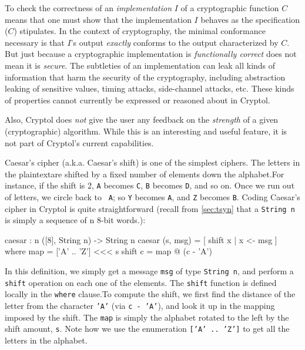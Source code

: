To check the correctness of an \emph{implementation} $I$ of a
cryptographic function $C$ means that one must show that the
implementation $I$ behaves as the specification ($C$) stipulates.  In
the context of cryptography, the minimal conformance necessary is
that $I$'s output \emph{exactly} conforms to the output characterized
by $C$.  But just because a cryptographic implementation is
\emph{functionally correct} does not mean it is \emph{secure}.  The
subtleties of an implementation can leak all kinds of information that
harm the security of the cryptography, including abstraction leaking
of sensitive values, timing attacks, side-channel attacks, etc.  These
kinds of properties cannot currently be expressed or reasoned about in
Cryptol.

Also, Cryptol does \emph{not} give the user any feedback on the
\emph{strength} of a given (cryptographic) algorithm.  While this is
an interesting and useful feature, it is not part of Cryptol's current
capabilities.


Caesar's cipher (a.k.a. Caesar's shift) is one of the simplest
ciphers.  The letters in the plaintext\indPlaintext are shifted by a
fixed number of elements down the alphabet.\indCaesarscipher For
instance, if the shift is 2, {\tt A} becomes {\tt C}, {\tt B} becomes
{\tt D}, and so on. Once we run out of letters, we circle back to {\tt
  A}; so {\tt Y} becomes {\tt A}, and {\tt Z} becomes {\tt B}.  Coding
Caesar's cipher in Cryptol is quite straightforward (recall from
\autoref{sec:tsyn} that a {\tt String n} is simply a sequence of n
8-bit words.):\indTSString
\begin{code}
  caesar : {n} ([8], String n) -> String n
  caesar (s, msg) = [ shift x | x <- msg ]
        where map     = ['A' .. 'Z'] <<< s
              shift c = map @ (c - 'A')
\end{code}
In this definition, we simply get a message \texttt{msg} of type
\texttt{String n}, and perform a \texttt{shift} operation on each one
of the elements. The \texttt{shift} function is defined locally in the
\texttt{where} clause.\indWhere To compute the shift, we first find
the distance of the letter from the character \texttt{'A'} (via
\texttt{c - 'A'}), and look it up in the mapping imposed by the shift.
The {\tt map} is simply the alphabet rotated to the left by the shift
amount, \texttt{s}. Note how we use the enumeration
\texttt{['A' ..\ 'Z']} to get all the letters in the alphabet.\indEnum

